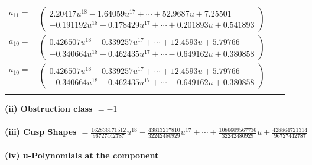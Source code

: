 \documentclass[1p]{elsarticle_modified}
\theoremstyle{definition}
\begin{document}
\begin{tabular}{m{7pt} m{180pt} m{7pt} m{180pt} }
\flushright $a_{11}=$&$\begin{pmatrix}2.20417 u^{18}-1.64059 u^{17}+\cdots+52.9687 u+7.25501\\-0.191192 u^{18}+0.178429 u^{17}+\cdots+0.201893 u+0.541893\end{pmatrix}$ \\
\flushright $a_{10}=$&$\begin{pmatrix}0.426507 u^{18}-0.339257 u^{17}+\cdots+12.4593 u+5.79766\\-0.340664 u^{18}+0.462435 u^{17}+\cdots-0.649162 u+0.380858\end{pmatrix}$\\ \flushright $a_{10}=$&$\begin{pmatrix}0.426507 u^{18}-0.339257 u^{17}+\cdots+12.4593 u+5.79766\\-0.340664 u^{18}+0.462435 u^{17}+\cdots-0.649162 u+0.380858\end{pmatrix}$\\&\end{tabular}
\flushleft \textbf{(ii) Obstruction class $= -1$}\\~\\
\flushleft \textbf{(iii) Cusp Shapes $= \frac{162836171512}{96727442787} u^{18}-\frac{43813217810}{32242480929} u^{17}+\cdots+\frac{1086609567736}{32242480929} u+\frac{428864721314}{96727442787}$}\\~\\
\newpage\renewcommand{\arraystretch}{1}
\flushleft \textbf{(iv) u-Polynomials at the component}\newline \\
\end{document}
